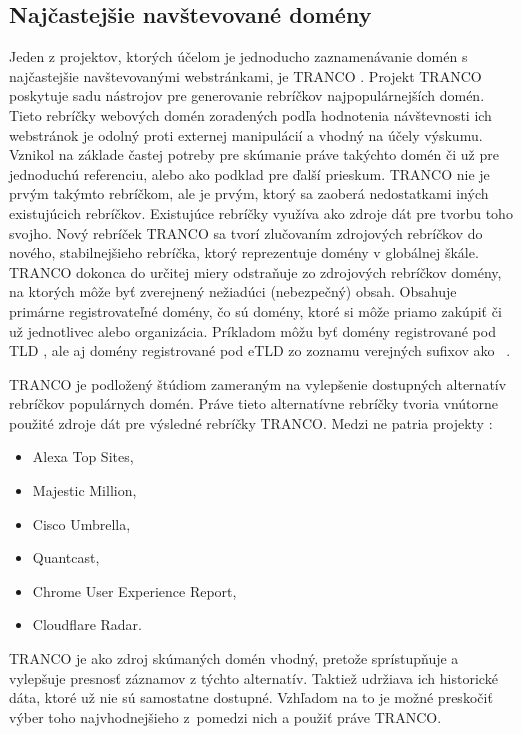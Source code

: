 \subsection{Najčastejšie navštevované domény}

Jeden z projektov, ktorých účelom je jednoducho zaznamenávanie domén s najčastejšie navštevovanými webstránkami, je TRANCO \cite{tranco}.
Projekt TRANCO poskytuje sadu nástrojov pre generovanie rebríčkov najpopulárnejších domén. 
Tieto rebríčky webových domén zoradených podľa hodnotenia návštevnosti ich webstránok je odolný proti externej manipulácií a vhodný na účely výskumu. 
Vznikol na základe častej potreby pre skúmanie práve takýchto domén či už pre jednoduchú referenciu, alebo ako podklad pre ďalší prieskum.
TRANCO nie je prvým takýmto rebríčkom, ale je prvým, ktorý sa zaoberá nedostatkami iných existujúcich rebríčkov.
Existujúce rebríčky využíva ako zdroje dát pre tvorbu toho svojho.
Nový rebríček TRANCO sa tvorí zlučovaním zdrojových rebríčkov do nového, stabilnejšieho rebríčka, ktorý reprezentuje domény v globálnej škále.
TRANCO dokonca do určitej miery odstraňuje zo zdrojových rebríčkov domény, na ktorých môže byť zverejnený nežiadúci (nebezpečný) obsah.
Obsahuje primárne registrovateľné domény, čo sú domény, ktoré si môže priamo zakúpiť či už jednotlivec alebo organizácia. 
Príkladom môžu byť domény registrované pod TLD , ale aj domény registrované pod eTLD zo zoznamu verejných sufixov ako \mbox{ \cite{tranco}}.

\pagebreak

TRANCO je podložený štúdiom zameraným na vylepšenie dostupných alternatív rebríčkov populárnych domén.
Práve tieto alternatívne rebríčky tvoria vnútorne použité zdroje dát pre výsledné rebríčky TRANCO.
Medzi ne patria projekty \cite{tranco-config}:
\begin{itemize}
    \item Alexa Top Sites,
    \item Majestic Million,
    \item Cisco Umbrella,
    \item Quantcast,
    \item Chrome User Experience Report,
    \item Cloudflare Radar.
\end{itemize}
TRANCO je ako zdroj skúmaných domén vhodný, pretože sprístupňuje a vylepšuje presnosť záznamov z týchto alternatív.
Taktiež udržiava ich historické dáta, ktoré už nie sú samostatne dostupné.
Vzhľadom na to je možné preskočiť výber toho najvhodnejšieho \mbox{z pomedzi} nich a použiť práve TRANCO.

